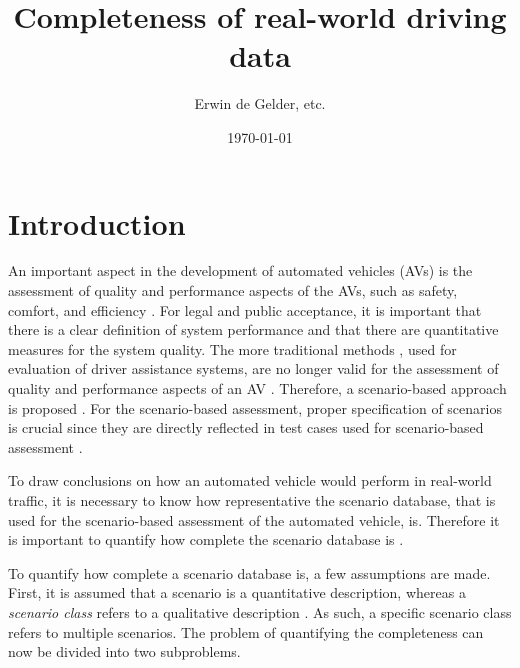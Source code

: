 \documentclass[10pt,final,a4paper,oneside,onecolumn]{article}
\def\reptitle{Completeness of real-world driving data}
\def\repauthor{Erwin de Gelder, etc.}
\theoremstyle{plain}\newtheorem{definition}{Definition}[section]    %
\theoremstyle{definition}\newtheorem{example}{Example}[section]     %
\theoremstyle{remark}\newtheorem{remarkenv}{Remark}[section]        %
\begin{document}

\title{\textbf{\reptitle}}
\author{\repauthor}
\date{\today}
\maketitle

\tableofcontents

\newpage

\section{Introduction}
\label{sec:introduction}

An important aspect in the development of automated vehicles (AVs) is the assessment of quality and performance aspects of the AVs, such as safety, comfort, and efficiency \cite{bengler2014threedecades, stellet2015taxonomy, wachenfeld2016release, putz2017pegasus, roesener2016scenariobased, kompass2015sicherheitsveranderung}. 
For legal and public acceptance, it is important that there is a clear definition of system performance and that there are quantitative measures for the system quality. 
The more traditional methods \cite{response2006code, ISO26262}, used for evaluation of driver assistance systems, are no longer valid for the assessment of quality and performance aspects of an AV \cite{wachenfeld2016release}. 
Therefore, a scenario-based approach is proposed \cite{roesener2016scenariobased, putz2017pegasus, kompass2015sicherheitsveranderung}. 
For the scenario-based assessment, proper specification of scenarios is crucial since they are directly reflected in test cases used for scenario-based assessment \cite{stellet2015taxonomy}.

To draw conclusions on how an automated vehicle would perform in real-world traffic, it is necessary to know how representative the scenario database, that is used for the scenario-based assessment of the automated vehicle, is. Therefore it is important to quantify how complete the scenario database is \cite{geyer2014, alvarez2017prospective, stellet2015taxonomy}.

To quantify how complete a scenario database is, a few assumptions are made. First, it is assumed that a scenario is a quantitative description, whereas a \emph{scenario class} refers to a qualitative description \cite{degelder2018ontology}. As such, a specific scenario class refers to multiple scenarios. The problem of quantifying the completeness can now be divided into two subproblems.
\end{document}
